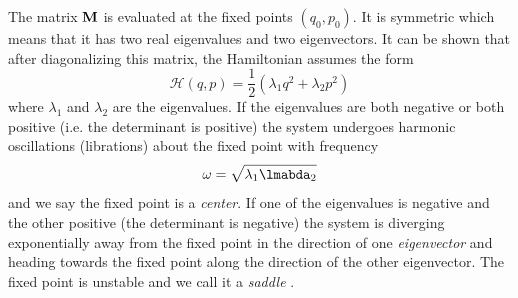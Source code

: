 The matrix $\boldsymbol{\mathbf{M}}$ is evaluated at the fixed points $(q_0,p_0)$.
It is symmetric which means that it has two real 
eigenvalues and two eigenvectors. It can be shown that after 
diagonalizing this matrix, the Hamiltonian assumes the form
\begin{equation}
    \mathcal{H}(q,p)= \frac{1}{2} (\lambda_1 q^2 + \lambda_2 p^2)
\end{equation}
where $\lambda_1$ and $\lambda_2$ are the eigenvalues. If the
eigenvalues are both negative or both positive (i.e. the
determinant is positive) the system undergoes
harmonic oscillations (librations) about the fixed point with 
frequency
\begin{equation}
    \omega = \sqrt{\lambda_1\lmabda_2}
\end{equation}
and we say the fixed point is a \emph{center}. If one of the 
eigenvalues is negative and the other positive (the determinant
is negative) the system is
diverging exponentially away from the fixed point in the 
direction of one \emph{eigenvector} and heading towards the 
fixed point along the direction of the other eigenvector. The
fixed point is unstable and we call it a \emph{saddle} .


